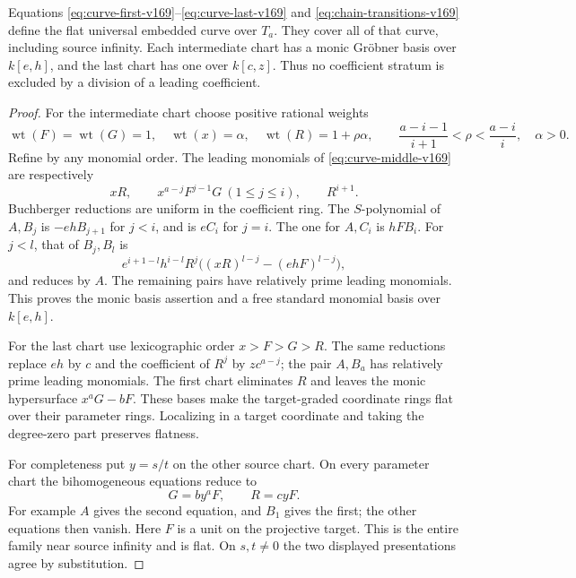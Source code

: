 \begin{proposition}\label{prop:curve-charts-v169}
Equations \eqref{eq:curve-first-v169}--\eqref{eq:curve-last-v169} and
\eqref{eq:chain-transitions-v169} define the flat universal embedded
curve over $T_a$. They cover all of that curve, including source
infinity. Each intermediate chart has a monic Gr\"obner basis over
$k[e,h]$, and the last chart has one over $k[c,z]$. Thus no
coefficient stratum is excluded by a division of a leading coefficient.
\end{proposition}
\begin{proof}
For the intermediate chart choose positive rational weights
\[
 \operatorname{wt}(F)=\operatorname{wt}(G)=1,\quad
 \operatorname{wt}(x)=\alpha,\quad
 \operatorname{wt}(R)=1+\rho\alpha,
 \qquad \frac{a-i-1}{i+1}<\rho<\frac{a-i}{i},\quad\alpha>0.
\]
Refine by any monomial order. The leading monomials of
\eqref{eq:curve-middle-v169} are respectively
\[
 xR,\qquad x^{a-j}F^{j-1}G\ (1\leq j\leq i),\qquad R^{i+1}.
\]
Buchberger reductions are uniform in the coefficient ring. The
$S$-polynomial of $A,B_j$ is $-ehB_{j+1}$ for $j<i$, and is $eC_i$
for $j=i$. The one for $A,C_i$ is $hFB_i$. For $j<l$, that of
$B_j,B_l$ is
\[
 e^{i+1-l}h^{i-l}R^j
       \big((xR)^{l-j}-(ehF)^{l-j}\big),
\]
and reduces by $A$. The remaining pairs have relatively prime leading
monomials. This proves the monic basis assertion and a free standard
monomial basis over $k[e,h]$.

For the last chart use lexicographic order $x>F>G>R$. The same
reductions replace $eh$ by $c$ and the coefficient of $R^j$ by
$zc^{a-j}$; the pair $A,B_a$ has relatively prime leading monomials.
The first chart eliminates $R$ and leaves the monic hypersurface
$x^aG-bF$. These bases make the target-graded coordinate rings flat
over their parameter rings. Localizing in a target coordinate and
taking the degree-zero part preserves flatness.

For completeness put $y=s/t$ on the other source chart. On every
parameter chart the bihomogeneous equations reduce to
\begin{equation}\label{eq:source-infinity-v169}
 G=b y^aF,\qquad R=c yF.
\end{equation}
For example $A$ gives the second equation, and $B_1$ gives the first;
the other equations then vanish. Here $F$ is a unit on the projective
target. This is the entire family near source infinity and is flat.
On $s,t\ne0$ the two displayed presentations agree by substitution.


\end{proof}
